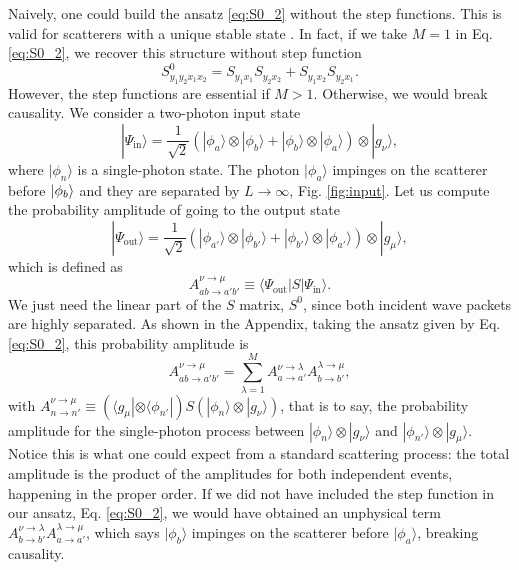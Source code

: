 \documentclass[notitlepage, prx, preprint, amsmath,superscriptaddress,amssymb]{revtex4-1}
\begin{document}
Naively, one could build the ansatz \eqref{eq:S0_2} without the step functions. This is valid for scatterers with a unique stable state \cite{Xu2013}. In fact, if we take $M=1$ in Eq. \eqref{eq:S0_2}, we recover this structure without step function
\begin{equation}\label{eq:S0_2_1}
S^0_{y_1y_2x_1x_2} = S_{y_1x_1}S_{y_2x_2} + S_{y_1x_2}S_{y_2x_1}.
\end{equation}
However, the step functions are essential if $M>1$. Otherwise, we would break causality. We consider a two-photon input state
\begin{equation}\label{eq:input}
|\Psi_\text{in}\rangle = \frac{1}{\sqrt{2}}(|\phi_a\rangle \otimes|\phi_b\rangle + |\phi_b\rangle\otimes |\phi_a\rangle)\otimes|g_\nu\rangle,
\end{equation}
where $|\phi_n\rangle$ is a single-photon state. The photon $|\phi_a\rangle$ impinges on the scatterer before $\ket{\phi_b}$ and they are separated by $L\to\infty$, Fig. \ref{fig:input}. Let us compute the probability amplitude of going to the output state
\begin{equation}\label{eq:output}
|\Psi_\text{out}\rangle = \frac{1}{\sqrt{2}}(|\phi_{a'}\rangle \otimes|\phi_{b'}\rangle + |\phi_{b'}\rangle\otimes |\phi_{a'}\rangle)\otimes|g_\mu\rangle,
\end{equation}
which is defined as
\begin{equation}\label{eq:A_def}
A_{ab\to a'b'}^{\nu\to\mu} \equiv \langle \Psi_\text{out}|S|\Psi_\text{in}\rangle.
\end{equation}
We just need the linear part of the $S$ matrix, $S^0$, since both incident wave packets are highly separated. As shown in the Appendix, taking the ansatz given by Eq. \eqref{eq:S0_2}, this probability amplitude is
\begin{equation}\label{eq:A}
A_{ab\to a'b'}^{\nu\to\mu} =  \sum_{\lambda=1}^M A_{a\to a'}^{\nu\to\lambda} A_{b\to b'}^{\lambda\to\mu},
\end{equation}
with $A_{n\to n'}^{\nu\to \mu}\equiv (\langle g_\mu |\otimes \langle \phi_{n'}|)S(|\phi_n\rangle\otimes |g_\nu\rangle)$, that is to say, the probability amplitude for the single-photon process between $|\phi_n\rangle\otimes |g_\nu\rangle$ and $|\phi_{n'}\rangle\otimes |g_\mu\rangle$. Notice this is what one could expect from a standard scattering process: the total amplitude is the product of the amplitudes for both independent events, happening in the proper order. If we did not have included the step function in our ansatz, Eq. \eqref{eq:S0_2}, we would have obtained an unphysical term $A_{b\to b'}^{\nu\to\lambda} A_{a\to a'}^{\lambda\to\mu}$, which says $|\phi_b\rangle$ impinges on the scatterer before $|\phi_a\rangle$, breaking causality.%
\end{document}

